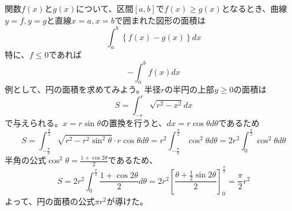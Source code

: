 \documentclass[a4j,dvipdfmx]{jsarticle}
\begin{document}
                関数$f(x)$と$g(x)$について、区間$[a,b]$で$f(x)\geq g(x)$となるとき、曲線$y=f,y=g$と直線$x=a,x=b$で囲まれた図形の面積は
                \begin{equation}
                    \int_{a}^{b} \left\{f(x)-g(x)\right\}dx \label{eq:曲線で囲まれた面積}
                \end{equation}
                特に、$f\leq 0$であれば
                \begin{equation}
                    -\int_a^b f(x)dx \label{eq:-負の面積}
                \end{equation}
                例として、円の面積を求めてみよう。半径$r$の半円の上部$y\geq 0$の面積は
                \begin{equation*}
                    S=\int_{-r}^{r}\sqrt{r^2-x^2}dx
                \end{equation*}
                で与えられる。$x=r\sin\theta$の置換を行うと、$dx=r\cos\theta d\theta$であるため
                \begin{equation*}
                    S=\int_{-\frac{\pi}{2}}^{\frac{\pi}{2}}\sqrt{r^2-r^2\sin^2\theta}\cdot r\cos\theta d\theta=r^2\int_{-\frac{\pi}{2}}^{\frac{\pi}{2}}\cos^2\theta d\theta=2r^2\int_{0}^{\frac{\pi}{2}}\cos^2\theta d\theta
                \end{equation*}
                半角の公式$\displaystyle \cos^2\theta = \frac{1+\cos2\theta}{2}$であるため、
                \begin{equation*}
                    S=2r^2\int_{0}^{\frac{\pi}{2}}\frac{1+\cos 2\theta}{2}d\theta=2r^2\left[\frac{\theta+\frac{1}{2}\sin 2\theta}{2}\right]_0^{\frac{\pi}{2}}=\frac{\pi}{2}r^2
                \end{equation*}
                よって、円の面積の公式$\pi r^2$が導けた。
\end{document}
